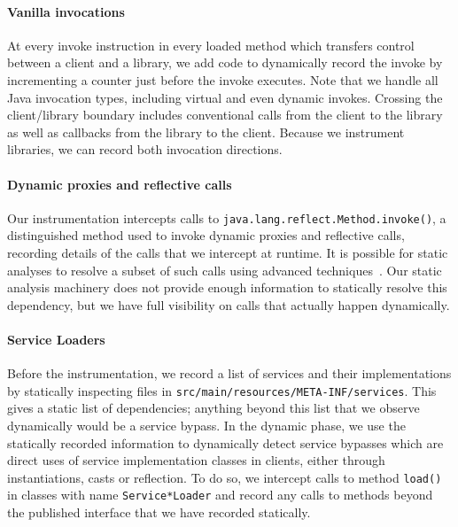 \paragraph{Vanilla invocations} 
At every invoke instruction in every
loaded method which transfers control between a client and a
library, we add code to dynamically record
the invoke by incrementing a counter just before the invoke
executes. Note that we handle all Java invocation types, including
virtual and even dynamic invokes. Crossing the client/library boundary
includes conventional calls from the client to the library as well as
callbacks from the library to the client.  Because we instrument
libraries, we can record both invocation directions.

\paragraph{Dynamic proxies and reflective calls}
Our instrumentation intercepts calls to
\texttt{java.lang.reflect.Method.invoke()}, a distinguished method
used to invoke dynamic proxies and reflective calls, 
recording details of the calls that we intercept at runtime. It is possible for
static analyses to resolve a subset of such calls using advanced
techniques~\cite{christensen03:_precis_analy_strin_expres}. Our static analysis machinery does not provide enough information to
statically resolve this dependency, but we have full visibility on
calls that actually happen dynamically.

\paragraph{Service Loaders} Before the instrumentation, we record a list 
of services and their implementations by statically inspecting files in \texttt{src/main/resources/META-INF/services}. 
This gives a static list of dependencies; anything beyond this list that we observe dynamically would be a service bypass. 
In the dynamic phase, we use the statically recorded information to dynamically detect service bypasses which are direct uses of service implementation 
classes in clients, either through instantiations, casts or reflection. To do so, we intercept calls 
to method \texttt{load()} in classes with name \texttt{Service*Loader} and record any calls to methods beyond 
the published interface that we have recorded statically.

